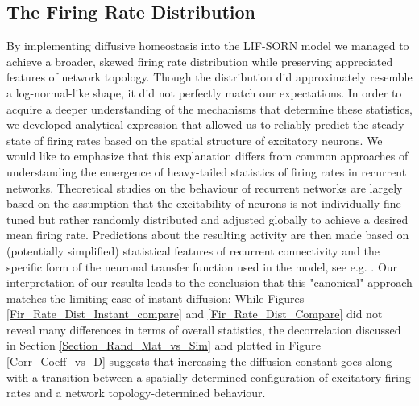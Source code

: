 \documentclass[10pt,a4paper]{article}
\begin{document}
\subsection{The Firing Rate Distribution}
By implementing diffusive homeostasis into the LIF-SORN model we managed to achieve a broader, skewed firing rate distribution while preserving appreciated features of network topology. Though the distribution did approximately resemble a log-normal-like shape, it did not perfectly match our expectations. In order to acquire a deeper understanding of the mechanisms that determine these statistics, we developed analytical expression that allowed us to reliably predict the steady-state of firing rates based on the spatial structure of excitatory neurons. We would like to emphasize that this explanation differs from common approaches of understanding the emergence of heavy-tailed statistics of firing rates in recurrent networks. Theoretical studies on the behaviour of recurrent networks are largely based on the assumption that the excitability of neurons is not individually fine-tuned but rather randomly distributed and adjusted globally to achieve a desired mean firing rate. Predictions about the resulting activity are then made based on (potentially simplified) statistical features of recurrent connectivity and the specific form of the neuronal transfer function used in the model, see e.g. \cite{Roxin_Firing_Rate_Distribution,Vreeswijk1998}. Our interpretation of our results leads to the conclusion that this "canonical" approach matches the limiting case of instant diffusion: While Figures \ref{Fir_Rate_Dist_Instant_compare} and \ref{Fir_Rate_Dist_Compare} did not reveal many differences in terms of overall statistics, the decorrelation discussed in Section \ref{Section_Rand_Mat_vs_Sim} and plotted in Figure \ref{Corr_Coeff_vs_D} suggests that increasing the diffusion constant goes along with a transition between a spatially determined configuration of excitatory firing rates and a network topology-determined behaviour.
\end{document}
